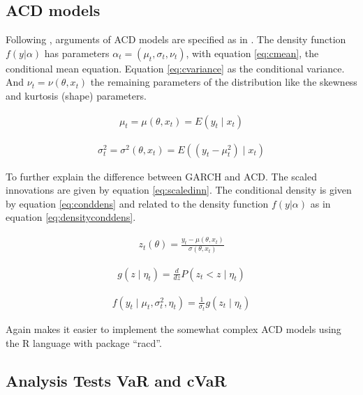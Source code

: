 \documentclass[a4paper, twoside]{templates/ociamthesis}
\begin{document}
\hypertarget{acd-models-meth}{%
\subsection{ACD models}\label{acd-models-meth}}

\noindent Following \textcite{ghalanos2016}, arguments of ACD models are specified as in \textcite{hansen1994}. The density function \(f(y|\alpha)\) has parameters \(\alpha_t = (\mu_t, \sigma_t, \nu_t)\), with equation \eqref{eq:cmean}, the conditional mean equation. Equation \eqref{eq:cvariance} as the conditional variance. And \(\nu_t=\nu(\theta,x_t)\) the remaining parameters of the distribution like the skewness and kurtosis (shape) parameters.

\begin{align} 
\mu_{t}=\mu\left(\theta, x_{t}\right)=E\left(y_{t} \mid x_{t}\right)
 \label{eq:cmean}
\end{align}

\begin{align}
\sigma_{t}^{2}=\sigma^{2}\left(\theta, x_{t}\right)=E\left(\left(y_{t}-\mu_{t}^{2}\right) \mid x_{t}\right)
 \label{eq:cvariance}
\end{align}

\noindent To further explain the difference between GARCH and ACD. The scaled innovations are given by equation \eqref{eq:scaledinn}. The conditional density is given by equation \eqref{eq:conddens} and related to the density function \(f(y|\alpha)\) as in equation \eqref{eq:densityconddens}.

\begin{align}
z_{t}(\theta)=\frac{y_{t}-\mu\left(\theta, x_{t}\right)}{\sigma\left(\theta, x_{t}\right)}
\label{eq:scaledinn}
\end{align}

\begin{align}
g\left(z \mid \eta_{t}\right)=\frac{d}{d z} P\left(z_{t}<z \mid \eta_{t}\right)
\label{eq:conddens}
\end{align}

\begin{align}
f\left(y_{t} \mid \mu_{t}, \sigma_{t}^{2}, \eta_{t}\right)=\frac{1}{\sigma_{t}} g\left(z_{t} \mid \eta_{t}\right)
\end{align}
\label{eq:densityconddens}

Again \textcite{ghalanos2016} makes it easier to implement the somewhat complex ACD models using the R language with package ``racd''.

\hypertarget{analysis-tests-var-and-cvar}{%
\subsection{Analysis Tests VaR and cVaR}\label{analysis-tests-var-and-cvar}}
\end{document}
